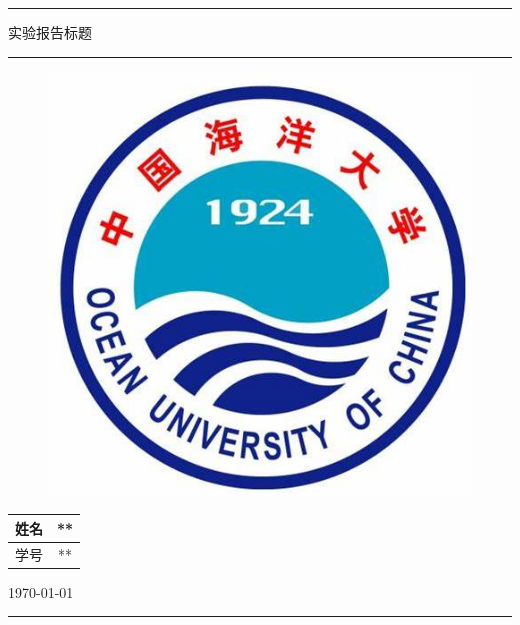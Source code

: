 \documentclass{my_report}
\begin{document}
\songti %

  \begin{titlepage} %
    \centering%
    \rule{\textwidth}{1pt}  %
    \vspace{0.2\textheight}  %

    {\Huge 实验报告标题}%
    
    \vspace{0.025\textheight}   
    \rule{0.83\textwidth}{0.4pt} 
    \vspace{0.1\textheight}  
 
\begin{figure}[htbp]    %
\centering
\includegraphics[scale=0.2]{校徽.png}
\end{figure}
\vfill %


\begin{tabular}{c|c}    %
\hline
\large{姓名}&\large{**} \\
\hline
\large{学号}&\large{**}\\
\hline
\end{tabular}

    \vfill  %
    {\large \today} %
    \vspace{0.1\textheight}  

    \rule{\textwidth}{1pt}  
  \end{titlepage}
\end{document}
